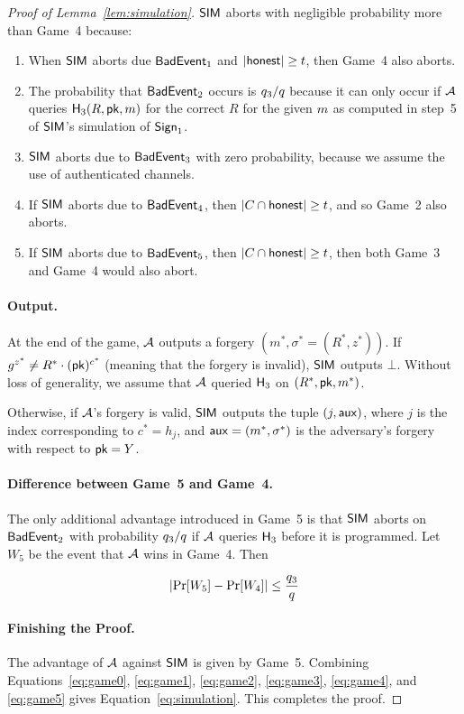 \begin{proof}[Proof of Lemma~\ref{lem:simulation}]
  $\mathsf{SIM}$ aborts with negligible probability more than Game~4 because:
  \begin{enumerate}
    \item When $\mathsf{SIM}$ aborts due $\mathsf{BadEvent}_1$ and $\lvert \mathsf{honest} \rvert \geq t$,
      then Game~4 also aborts.
    \item The probability that $\mathsf{BadEvent}_2$ occurs is $q_3/q$ because it can only occur if $\mathcal{A}$ queries $\mathsf{H}_3(R, \mathsf{pk}, m)$ for the correct $R$ for the given $m$ as computed in step~5 of $\mathsf{SIM}$'s simulation of $\mathsf{Sign}_1$.
    \item $\mathsf{SIM}$ aborts due to $\mathsf{BadEvent}_3$ with zero probability,
      because we assume the use of authenticated channels.
    \item If $\mathsf{SIM}$ aborts due to $\mathsf{BadEvent}_4$,
      then $\lvert C \cap \mathsf{honest} \rvert \geq t$,
      and so Game~2 also aborts.
    \item If $\mathsf{SIM}$ aborts due to $\mathsf{BadEvent}_5$,
      then $\lvert C \cap \mathsf{honest} \rvert \geq t$,
      then both Game~3 and Game~4 would also abort.
  \end{enumerate}


\paragraph{Output.} At the end of the game,
$\mathcal{A}$ outputs a forgery $(m^*, \sigma^* = (R^*, z^*))$.
If $g^{z^*} \neq R^* \cdot (\mathsf{pk})^{c^*}$ (meaning that the forgery is invalid),
$\mathsf{SIM}$ outputs $\bot$.
Without loss of generality,
we assume that $\mathcal{A}$ queried $\mathsf{H}_3$ on $(R^*, \mathsf{pk}, m^*)$.


Otherwise,
if $\mathcal{A}$'s forgery is valid,
$\mathsf{SIM}$ outputs the tuple $(j, \mathsf{aux})$,
where $j$ is the index corresponding to $c^* = h_j$,
and $\mathsf{aux}=(m^*, \sigma^*)$ is the adversary's forgery with respect to $\mathsf{pk}=Y$.

  \paragraph{Difference between Game~5 and Game~4.}
  The only additional advantage introduced in Game~5 is that $\mathsf{SIM}$ aborts on  $\mathsf{BadEvent}_2$ with
  probability $q_3/q$ if $\mathcal{A}$ queries $\mathsf{H}_3$ before it is programmed.
  Let $W_5$ be the event that $\mathcal{A}$ wins in Game~4.
  Then

  \begin{equation} \label{eq:game5}
    \lvert \Pr[W_5] - \Pr[W_4] \rvert \leq  \frac{q_3}{q}
  \end{equation}


\medskip

  \paragraph{Finishing the Proof.}
  The advantage of $\mathcal{A}$ against $\mathsf{SIM}$ is given by Game~5.
  Combining Equations~\ref{eq:game0}, \ref{eq:game1}, \ref{eq:game2}, \ref{eq:game3}, \ref{eq:game4}, and \ref{eq:game5} gives Equation~\ref{eq:simulation}.
  This completes the proof.
\end{proof}

